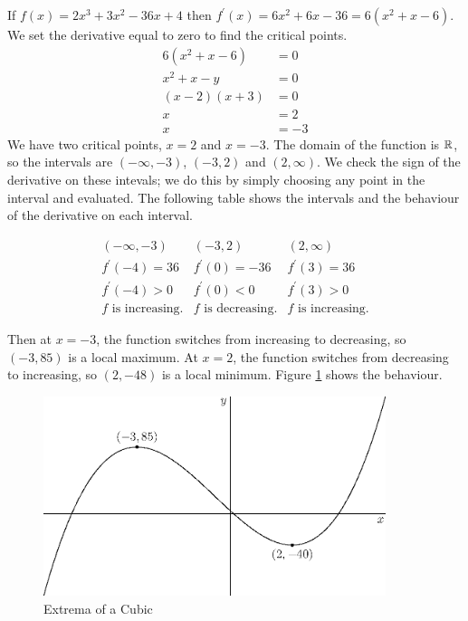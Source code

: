 \documentclass[fleqn]{report}
\begin{document}
\begin{example}
If $f(x) = 2x^3 + 3x^2 - 36x + 4$ then $f^\prime(x) = 6x^2 +
6x - 36 = 6(x^2 + x - 6)$. We set the derivative equal to
zero to find the critical points.
\begin{align*}
6 (x^2 + x - 6) & = 0 \\
x^2 + x - y & = 0 \\
(x-2)(x+3) & = 0 \\
x & = 2 \\
x & = -3
\end{align*}
We have two critical points, $x=2$ and $x=-3$. The domain of
the function is $\mathbb{R}$, so the intervals are $(-\infty,-3)$,
$(-3,2)$ and $(2,\infty)$. We check the sign of the
derivative on these intevals; we do this by simply choosing
any point in the interval and evaluated. The following table
shows the intervals and the behaviour of the derivative on
each interval. 

\begin{displaymath}
\begin{array}{ccc}
(-\infty, -3) & (-3,2) & (2,\infty) \\[1em]
f^\prime(-4) = 36 & f^\prime(0) = -36 &
f^\prime(3) = 36 \\[1em]
f^\prime(-4) > 0 & f^\prime(0) < 0 & f^\prime(3)
> 0 \\[1em]
f \text{ is increasing.} & f \text{ is decreasing.}
& f \text{ is increasing.}
\end{array}
\end{displaymath}

Then at $x=-3$, the function switches from increasing to
decreasing, so $(-3,85)$ is a local maximum. At $x=2$, the
function switches from decreasing to increasing, so $(2,-48)$
is a local minimum. Figure \ref{figure-cubic-extrema-example} shows
the behaviour.
\end{example}

\begin{figure}[t]
\centering
\includegraphics[width=10cm]{figure55.eps}
\caption{Extrema of a Cubic}
\label{figure-cubic-extrema-example}
\end{figure}
\end{document}

